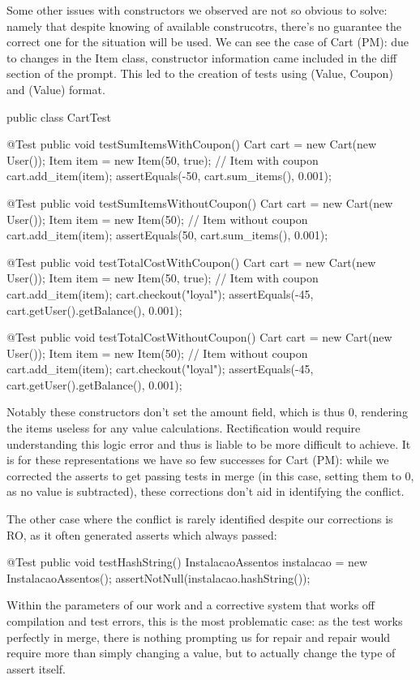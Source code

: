 Some other issues with constructors we observed are not so obvious to solve: namely that despite knowing of available construcotrs, there's no guarantee
the correct one for the situation will be used. We can see the case of Cart (PM): due to changes in the Item class, constructor information came included
in the diff section of the prompt. This led to the creation of tests using (Value, Coupon) and (Value) format.
\begin{answer}
    public class CartTest {

    @Test
    public void testSumItemsWithCoupon() {
        Cart cart = new Cart(new User());
        Item item = new Item(50, true); // Item with coupon
        cart.add_item(item);
        assertEquals(-50, cart.sum_items(), 0.001);
    }

    @Test
    public void testSumItemsWithoutCoupon() {
        Cart cart = new Cart(new User());
        Item item = new Item(50); // Item without coupon
        cart.add_item(item);
        assertEquals(50, cart.sum_items(), 0.001);
    }

    @Test
    public void testTotalCostWithCoupon() {
        Cart cart = new Cart(new User());
        Item item = new Item(50, true); // Item with coupon
        cart.add_item(item);
        cart.checkout("loyal");
        assertEquals(-45, cart.getUser().getBalance(), 0.001);
    }

    @Test
    public void testTotalCostWithoutCoupon() {
        Cart cart = new Cart(new User());
        Item item = new Item(50); // Item without coupon
        cart.add_item(item);
        cart.checkout("loyal");
        assertEquals(-45, cart.getUser().getBalance(), 0.001);
    }
}
\end{answer}
Notably these constructors don't set the amount field, which is thus 0, rendering the items useless for any value calculations.
Rectification would require understanding this logic error and thus is liable to be more difficult to achieve. It is for these representations
we have so few successes for Cart (PM): while we corrected the asserts to get passing tests in merge (in this case, setting them to 0, as no
value is subtracted), these corrections don't aid in identifying the conflict.

The other case where the conflict is rarely identified despite our corrections is RO, as it often generated asserts which always passed:
\begin{answer}
    @Test
    public void testHashString() {
        InstalacaoAssentos instalacao = new InstalacaoAssentos();
        assertNotNull(instalacao.hashString());
    }
\end{answer}
Within the parameters of our work and a corrective system that works off compilation and test errors, this is the most problematic case: as the test works perfectly in merge,
there is nothing prompting us for repair and repair would require more than simply changing a value, but to actually change the type of assert itself.

